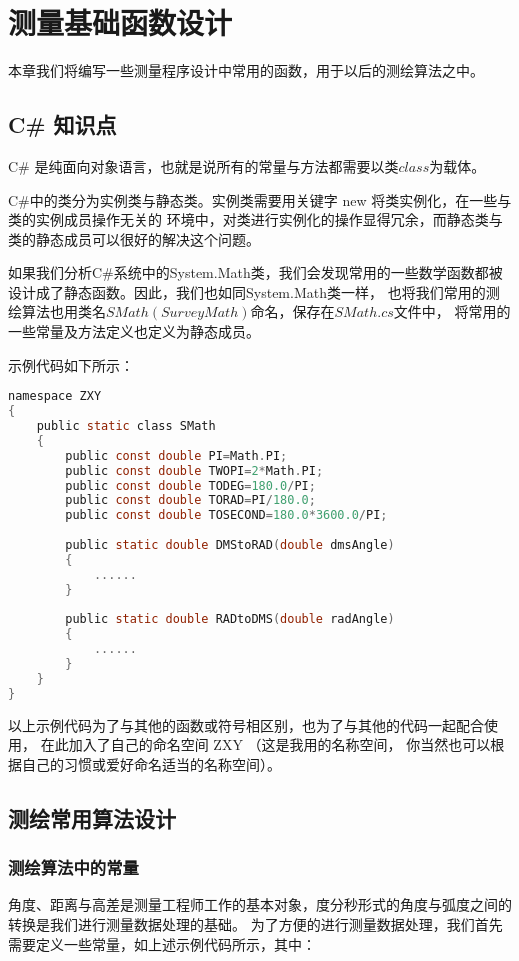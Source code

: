 
\chapter{测量基础函数设计}

本章我们将编写一些测量程序设计中常用的函数，用于以后的测绘算法之中。

\section{C\# 知识点}

C\# 是纯面向对象语言，也就是说所有的常量与方法都需要以类$class$为载体。

C\#中的类分为实例类与静态类。实例类需要用关键字 new 将类实例化，在一些与类的实例成员操作无关的
环境中，对类进行实例化的操作显得冗余，而静态类与类的静态成员可以很好的解决这个问题。 

如果我们分析C\#系统中的System.Math类，我们会发现常用的一些数学函数都被设计成了静态函数。因此，我们也如同System.Math类一样，
也将我们常用的测绘算法也用类名$SMath(SurveyMath)$命名，保存在$SMath.cs$文件中，
将常用的一些常量及方法定义也定义为静态成员。

示例代码如下所示：
\begin{lstlisting}[language=C]
namespace ZXY
{
    public static class SMath
    {
        public const double PI=Math.PI;
        public const double TWOPI=2*Math.PI;
        public const double TODEG=180.0/PI; 
        public const double TORAD=PI/180.0;
        public const double TOSECOND=180.0*3600.0/PI;
    
        public static double DMStoRAD(double dmsAngle)
        {
            ......
        }
    
        public static double RADtoDMS(double radAngle)
        {
            ......
        }
    }
}
\end{lstlisting}

以上示例代码为了与其他的函数或符号相区别，也为了与其他的代码一起配合使用，
在此加入了自己的命名空间 ZXY （这是我用的名称空间，
你当然也可以根据自己的习惯或爱好命名适当的名称空间）。


\section{测绘常用算法设计}

\subsection{测绘算法中的常量}
角度、距离与高差是测量工程师工作的基本对象，度分秒形式的角度与弧度之间的转换是我们进行测量数据处理的基础。
为了方便的进行测量数据处理，我们首先需要定义一些常量，如上述示例代码所示，其中：

